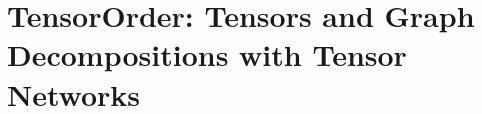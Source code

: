 \chapter{TensorOrder: Tensors and Graph Decompositions with Tensor Networks}
\label{ch:tensors}







